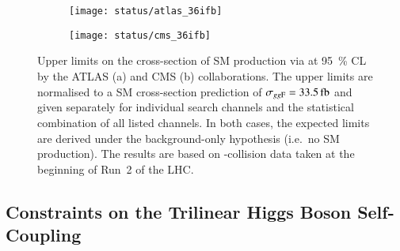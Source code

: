 \begin{figure}[htbp]
  \centering

  \begin{subfigure}[b]{0.48\textwidth}
    \centering

    \texttt{[image: status/atlas\_36ifb]}

  \end{subfigure}\hfill%
  \begin{subfigure}[b]{0.48\textwidth}
    \centering

    \texttt{[image: status/cms\_36ifb]}

  \end{subfigure}

  \caption{Upper limits on the cross-section of SM \HH production via \ggF at
    \SI{95}{\percent} CL by the ATLAS (a) and CMS (b) collaborations. The upper
    limits are normalised to a SM cross-section prediction of
    $\sigma_{\ggF} = \SI{33.5}{\femto\barn}$ and given separately for individual
    search channels and the statistical combination of all listed channels. In
    both cases, the expected limits are derived under the background-only
    hypothesis (i.e.\ no SM \HH production). The results are based on
    \pp-collision data taken at the beginning of Run~2 of the LHC.}%
  \label{fig:prior_status_smhh}
\end{figure}


\subsection{Constraints on the Trilinear Higgs Boson Self-Coupling}%
\label{sec:past_results_klambda}

